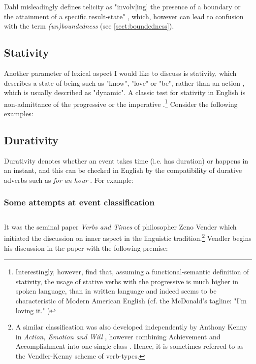 Dahl misleadingly defines telicity as "involv[ing] the presence of a boundary or the attainment of a specific result-state" \citep{DAHL2015210}, which, however can lead to confusion with the term \emph{(un)boundedness} (see \ref{sect:boundedness}).

\subsection*{Stativity}
Another parameter of lexical aspect I would like to discuss is stativity, which describes a state of being such as "know", "love" or "be", rather than an action \citep{binnick1991time}, which is usually described as "dynamic". A classic test for stativity in English is non-admittance of the progressive or the imperative \citep{McINTOSH+1975+35+42}.\footnote{Interestingly, however, \citet{Granath_Wherrity_2013} find that, assuming a functional-semantic definition of stativity, the usage of stative verbs with the progressive is much higher in spoken language, than in written language and indeed seems to be characteristic of Modern American English (cf. the McDonald's tagline: "I'm loving it." \citep{Freund2016RecentCI})} Consider the following examples:
\begin{exe}
\end{exe}
\subsection*{Durativity}
Durativity denotes whether an event takes time (i.e. has duration) or happens in an instant, and this can be checked in English by the compatibility of durative adverbs such as \emph{for an hour} \citep{102998}. For example:
\begin{exe}
\end{exe}
\subsubsection{Some attempts at event classification}
\subsection*{\citet{vendler57}}
It was the seminal paper \emph{Verbs and Times} \citep{vendler57} of philosopher Zeno Vender which initiated the discussion on inner aspect in the linguistic tradition.\footnote{A similar classification was also developed independently by Anthony Kenny in \emph{Action, Emotion and Will} \citep{Kenny1963-KENAEA}, however combining Achievement and Accomplishment into one single class \citep{19c36731-bdec-362e-9f45-1aaba76109d7}. Hence, it is sometimes referred to as the Vendler-Kenny scheme of verb-types.} Vendler begins his discussion in the paper with the following premise:

